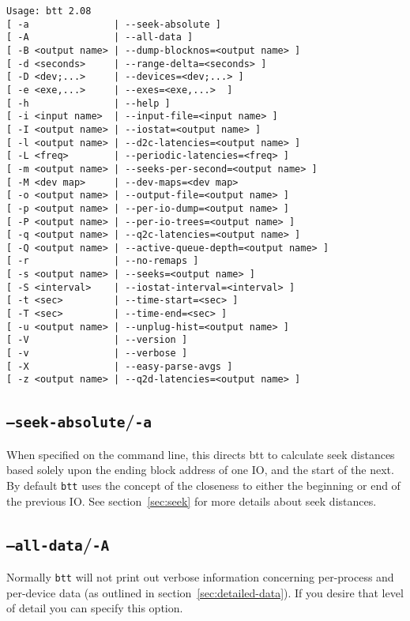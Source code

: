 \documentclass{article}
\begin{document}
\begin{verbatim}
Usage: btt 2.08
[ -a               | --seek-absolute ]
[ -A               | --all-data ]
[ -B <output name> | --dump-blocknos=<output name> ]
[ -d <seconds>     | --range-delta=<seconds> ]
[ -D <dev;...>     | --devices=<dev;...> ]
[ -e <exe,...>     | --exes=<exe,...>  ]
[ -h               | --help ]
[ -i <input name>  | --input-file=<input name> ]
[ -I <output name> | --iostat=<output name> ]
[ -l <output name> | --d2c-latencies=<output name> ]
[ -L <freq>        | --periodic-latencies=<freq> ]
[ -m <output name> | --seeks-per-second=<output name> ]
[ -M <dev map>     | --dev-maps=<dev map>
[ -o <output name> | --output-file=<output name> ]
[ -p <output name> | --per-io-dump=<output name> ]
[ -P <output name> | --per-io-trees=<output name> ]
[ -q <output name> | --q2c-latencies=<output name> ]
[ -Q <output name> | --active-queue-depth=<output name> ]
[ -r               | --no-remaps ]
[ -s <output name> | --seeks=<output name> ]
[ -S <interval>    | --iostat-interval=<interval> ]
[ -t <sec>         | --time-start=<sec> ]
[ -T <sec>         | --time-end=<sec> ]
[ -u <output name> | --unplug-hist=<output name> ]
[ -V               | --version ]
[ -v               | --verbose ]
[ -X               | --easy-parse-avgs ]
[ -z <output name> | --q2d-latencies=<output name> ]
\end{verbatim}

\subsection{\label{sec:o-a}\texttt{--seek-absolute}/\texttt{-a}}

  When specified on the command line, this directs btt to calculate
  seek distances based solely upon the ending block address of one IO,
  and the start of the next.  By default \texttt{btt} uses the concept
  of the closeness to either the beginning or end of the previous IO. See
  section~\ref{sec:seek} for more details about seek distances.

\subsection{\label{sec:o-A}\texttt{--all-data}/\texttt{-A}}

  Normally \texttt{btt} will not print out verbose information
  concerning per-process and per-device data (as outlined in
  section~\ref{sec:detailed-data}). If you desire that level of
  detail you can specify this option.
\end{document}
